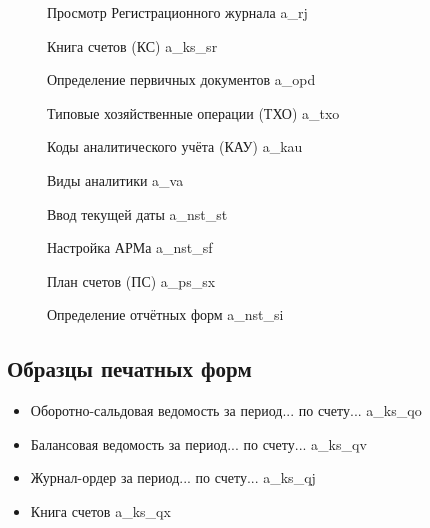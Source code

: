 \begin{figure}[!htb]
    \centering
    \caption{Просмотр Регистрационного журнала \gpiFIO\/a\_rj}
\end{figure}

\begin{figure}[!htb]
    \centering
    \caption{Книга счетов (КС) \gpiFIO\/a\_ks\_sr}
\end{figure}

\begin{figure}[!htb]
    \centering
    \caption{Определение первичных документов \gpiFIO\/a\_opd}
\end{figure}

\begin{figure}[!htb]
    \centering
    \caption{Типовые хозяйственные операции (ТХО) \gpiFIO\/a\_txo}
\end{figure}

\begin{figure}[!htb]
    \centering
    \caption{Коды аналитического учёта (КАУ) \gpiFIO\/a\_kau}
\end{figure}

\begin{figure}[!htb]
    \centering
    \caption{Виды аналитики \gpiFIO\/a\_va}
\end{figure}

\begin{figure}[!htb]
    \centering
    \caption{Ввод текущей даты \gpiFIO\/a\_nst\_st}
\end{figure}

\begin{figure}[!htb]
    \centering
    \caption{Настройка АРМа \gpiFIO\/a\_nst\_sf}
\end{figure}

\begin{figure}[!htb]
    \centering
    \caption{План счетов (ПС) \gpiFIO\/a\_ps\_sx}
\end{figure}

\begin{figure}[!htb]
    \centering
    \caption{Определение отчётных форм \gpiFIO\/a\_nst\_si}
\end{figure}

\newpage

\subsection{Образцы печатных форм}

\begin{itemize}
    \item Оборотно-сальдовая ведомость за период... по счету... \gpiFIO\/a\_ks\_qo
    \item Балансовая ведомость за период... по счету...  \gpiFIO\/a\_ks\_qv
    \item Журнал-ордер за период... по счету... \gpiFIO\/a\_ks\_qj
    \item Книга счетов \gpiFIO\/a\_ks\_qx
\end{itemize}

